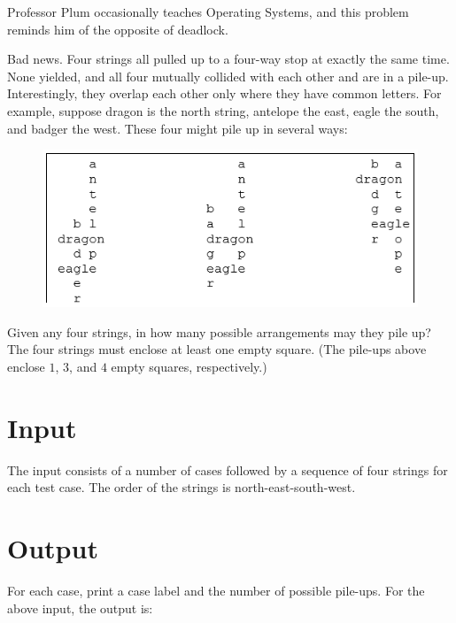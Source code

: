 
Professor Plum occasionally teaches Operating Systems, and this problem reminds him of the opposite of deadlock.

Bad news. Four strings all pulled up to a four-way stop at exactly the same time. None yielded, and all four mutually collided with each other and are in a pile-up. Interestingly, they overlap each other only where they have common letters. For example, suppose dragon is the north string, antelope the east, eagle the south, and badger the west. These four might pile up in several ways:

\begin{figure}[h]
\begin{center}
\includegraphics{problem5words.png} 
\end{center}
\end{figure}

Given any four strings, in how many possible arrangements may they pile up? The four strings must enclose at least one empty square. (The pile-ups above enclose $1$, $3$, and $4$ empty squares, respectively.)

\section*{Input}
The input consists of a number of cases followed by a sequence of four strings for each test case. The order of the strings is north-east-south-west.

\section*{Output}
For each case, print a case label and the number of possible pile-ups. For the above input, the output is:
